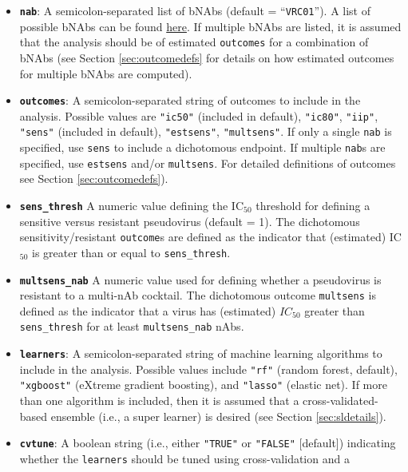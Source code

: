 \documentclass[]{article}
\providecommand{\tightlist}{%
  \setlength{\itemsep}{0pt}\setlength{\parskip}{0pt}}
\begin{document}
\begin{itemize}
\tightlist
\item
  \textbf{\texttt{nab}}: A semicolon-separated list of bNAbs (default =
  ``\texttt{VRC01}''). A list of possible bNAbs can be found
  \href{https://www.hiv.lanl.gov/components/sequence/HIV/neutralization/main.comp}{here}.
  If multiple bNAbs are listed, it is assumed that the analysis should
  be of estimated \texttt{outcomes} for a combination of bNAbs (see
  Section \ref{sec:outcomedefs} for details on how estimated outcomes
  for multiple bNAbs are computed).
\item
  \textbf{\texttt{outcomes}}: A semicolon-separated string of outcomes
  to include in the analysis. Possible values are \texttt{"ic50"}
  (included in default), \texttt{"ic80"}, \texttt{"iip"},
  \texttt{"sens"} (included in default), \texttt{"estsens"},
  \texttt{"multsens"}. If only a single \texttt{nab} is specified, use
  \texttt{sens} to include a dichotomous endpoint. If multiple
  \texttt{nab}s are specified, use \texttt{estsens} and/or
  \texttt{multsens}. For detailed definitions of outcomes see Section
  \ref{sec:outcomedefs}).
\item
  \textbf{\texttt{sens\_thresh}} A numeric value defining the
  IC\(_{50}\) threshold for defining a sensitive versus resistant
  pseudovirus (default = 1). The dichotomous sensitivity/resistant
  \texttt{outcome}s are defined as the indicator that (estimated)
  IC\(_{50}\) is greater than or equal to \texttt{sens\_thresh}.
\item
  \textbf{\texttt{multsens\_nab}} A numeric value used for defining
  whether a pseudovirus is resistant to a multi-nAb cocktail. The
  dichotomous outcome \texttt{multsens} is defined as the indicator that
  a virus has (estimated) \(IC_{50}\) greater than \texttt{sens\_thresh}
  for at least \texttt{multsens\_nab} nAbs.
\item
  \textbf{\texttt{learners}}: A semicolon-separated string of machine
  learning algorithms to include in the analysis. Possible values
  include \texttt{"rf"} (random forest, default), \texttt{"xgboost"}
  (eXtreme gradient boosting), and \texttt{"lasso"} (elastic net). If
  more than one algorithm is included, then it is assumed that a
  cross-validated-based ensemble (i.e., a super learner) is desired (see
  Section \ref{sec:sldetails}).
\item
  \textbf{\texttt{cvtune}}: A boolean string (i.e., either
  \texttt{"TRUE"} or \texttt{"FALSE"} {[}default{]}) indicating whether
  the \texttt{learners} should be tuned using cross-validation and a

\end{itemize}
\end{document}

